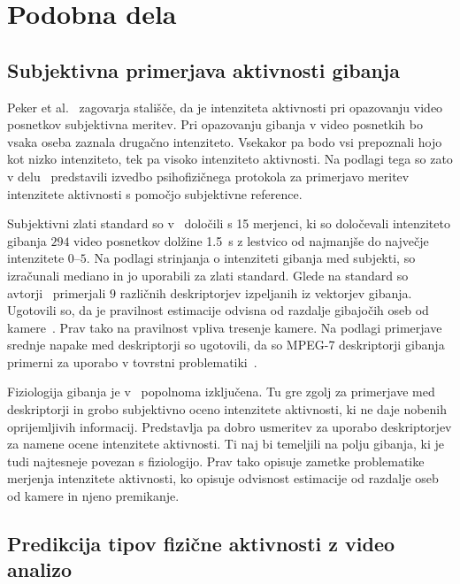 \section{Podobna dela}\label{sec:podobna-dela}



\subsection{Subjektivna primerjava aktivnosti gibanja}\label{sec:subjektivna-primerjava}

Peker et al.~\cite{peker2004framework} zagovarja stališče, da je intenziteta aktivnosti pri opazovanju video posnetkov subjektivna meritev. Pri opazovanju gibanja v video posnetkih bo vsaka oseba zaznala drugačno intenziteto. Vsekakor pa bodo vsi prepoznali hojo kot nizko intenziteto, tek pa visoko intenziteto aktivnosti. Na podlagi tega so zato v delu~\cite{peker2004framework} predstavili izvedbo psihofizičnega protokola za primerjavo meritev intenzitete aktivnosti s pomočjo subjektivne reference.

Subjektivni zlati standard so v~\cite{peker2004framework} določili s 15 merjenci, ki so določevali intenziteto gibanja $294$ video posnetkov dolžine \SI{1.5}{\s} z lestvico od najmanjše do največje intenzitete $0$--$5$. Na podlagi strinjanja o intenziteti gibanja med subjekti, so izračunali mediano in jo uporabili za zlati standard. Glede na standard so avtorji~\cite{peker2004framework} primerjali $9$ različnih deskriptorjev izpeljanih iz vektorjev gibanja. Ugotovili so, da je pravilnost estimacije odvisna od razdalje gibajočih oseb od kamere~\cite{peker2004framework}. Prav tako na pravilnost vpliva tresenje kamere. Na podlagi primerjave srednje napake med deskriptorji so ugotovili, da so MPEG-7 deskriptorji gibanja primerni za uporabo v tovrstni problematiki~\cite{peker2004framework}.

Fiziologija gibanja je v~\cite{peker2004framework} popolnoma izključena. Tu gre zgolj za primerjave med deskriptorji in grobo subjektivno oceno intenzitete aktivnosti, ki ne daje nobenih oprijemljivih informacij. Predstavlja pa dobro usmeritev za uporabo deskriptorjev za namene ocene intenzitete aktivnosti. Ti naj bi temeljili na polju gibanja, ki je tudi najtesneje povezan s fiziologijo. Prav tako opisuje zametke problematike merjenja intenzitete aktivnosti, ko opisuje odvisnost estimacije od razdalje oseb od kamere in njeno premikanje.




\subsection{Predikcija tipov fizične aktivnosti z video analizo}

